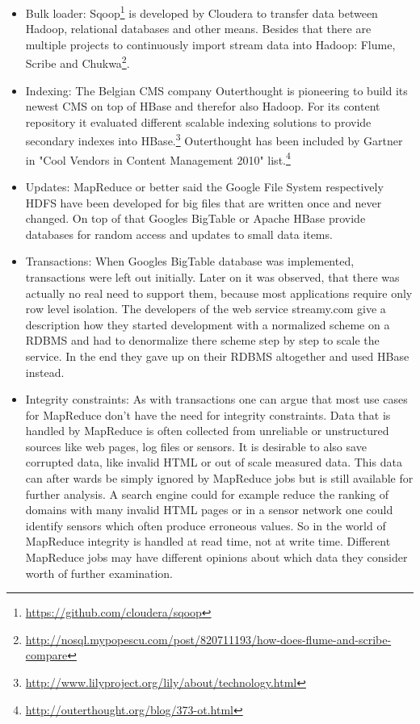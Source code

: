 \documentclass[12pt,a4paper]{scrartcl}		%
\begin{document}
\begin{itemize}
\item Bulk loader: Sqoop\footnote{\url{https://github.com/cloudera/sqoop}} is developed by Cloudera to transfer data between Hadoop, relational databases and other means. Besides that there are multiple projects to continuously import stream data into Hadoop: Flume, Scribe and Chukwa\footnote{\url{http://nosql.mypopescu.com/post/820711193/how-does-flume-and-scribe-compare}}.
\item Indexing: The Belgian CMS company Outerthought is pioneering to build its newest CMS on top of HBase and therefor also Hadoop. For its content repository it evaluated different scalable indexing solutions to provide secondary indexes into HBase.\footnote{\url{http://www.lilyproject.org/lily/about/technology.html}} Outerthought has been included by Gartner in "Cool Vendors in Content Management 2010" list.\footnote{\url{http://outerthought.org/blog/373-ot.html}}
\item Updates: MapReduce or better said the Google File System respectively HDFS have been developed for big files that are written once and never changed. On top of that Googles BigTable or Apache HBase provide databases for random access and updates to small data items.
\item Transactions: When Googles BigTable database was implemented, transactions were left out initially. Later on it was observed, that there was actually no real need to support them, because most applications require only row level isolation.\cite[p. 12]{Chang:2006:BDS:1267308.1267323} The developers of the web service streamy.com give a description how they started development with a normalized scheme on a RDBMS and had to denormalize there scheme step by step to scale the service. In the end they gave up on their RDBMS altogether and used HBase instead.\cite[p. 431-435]{White201010}
\item Integrity constraints: As with transactions one can argue that most use cases for MapReduce don't have the need for integrity constraints. Data that is handled by MapReduce is often collected from unreliable or unstructured sources like web pages, log files or sensors. It is desirable to also save corrupted data, like invalid HTML or out of scale measured data. This data can after wards be simply ignored by MapReduce jobs but is still available for further analysis. A search engine could for example reduce the ranking of domains with many invalid HTML pages or in a sensor network one could identify sensors which often produce erroneous values. So in the world of MapReduce integrity is handled at read time, not at write time. Different MapReduce jobs may have different opinions about which data they consider worth of further examination.

\end{itemize}
\end{document}
